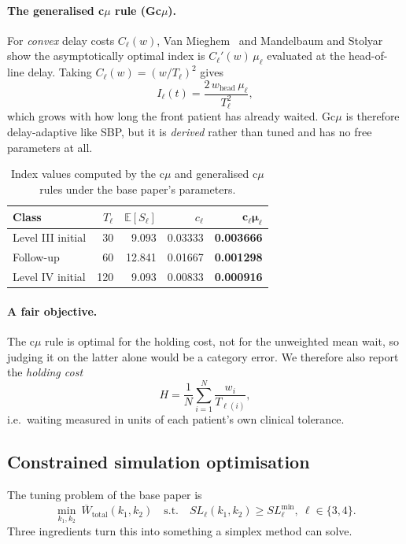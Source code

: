 \documentclass[sigconf,nonacm]{acmart}
\newcommand{\best}[1]{\textbf{#1}}
\begin{document}
\paragraph{The generalised c$\mu$ rule (Gc$\mu$).}
For \emph{convex} delay costs $C_\ell(w)$, Van Mieghem~\cite{vanmieghem1995gcmu}
and Mandelbaum and Stolyar~\cite{mandelbaum2004convex} show the asymptotically
optimal index is $C_\ell'(w)\,\mu_\ell$ evaluated at the head-of-line delay.
Taking $C_\ell(w)=(w/T_\ell)^2$ gives
\begin{equation}
I_\ell(t) = \frac{2\,w_{\text{head}}\,\mu_\ell}{T_\ell^{2}} ,
\label{eq:gcmu}
\end{equation}
which grows with how long the front patient has already waited. Gc$\mu$ is
therefore delay-adaptive like SBP, but it is \emph{derived} rather than tuned
and has no free parameters at all.

\begin{table}[t]
\caption{Index values computed by the c$\mu$ and generalised c$\mu$ rules under
         the base paper's parameters.}
\label{tab:cmu}
\small
\begin{tabular}{@{}lrrrr@{}}
\toprule
\textbf{Class} & $T_\ell$ & $\mathbb{E}[S_\ell]$ & $c_\ell$ & $\mathbf{c_\ell\mu_\ell}$ \\
\midrule
Level III initial & 30  & 9.093  & 0.03333 & \best{0.003666} \\
Follow-up         & 60  & 12.841 & 0.01667 & \best{0.001298} \\
Level IV initial  & 120 & 9.093  & 0.00833 & \best{0.000916} \\
\bottomrule
\end{tabular}
\end{table}

\paragraph{A fair objective.}
The c$\mu$ rule is optimal for the holding cost, not for the unweighted mean
wait, so judging it on the latter alone would be a category error. We therefore
also report the \emph{holding cost}
\begin{equation}
H = \frac{1}{N}\sum_{i=1}^{N} \frac{w_i}{T_{\ell(i)}} ,
\label{eq:holding}
\end{equation}
i.e.\ waiting measured in units of each patient's own clinical tolerance.

\subsection{Constrained simulation optimisation}
\label{sec:opt}
The tuning problem of the base paper is
\begin{equation}
\min_{k_1,k_2}\ \overline{W}_{\text{total}}(k_1,k_2)
\quad \text{s.t.} \quad SL_\ell(k_1,k_2) \ge SL^{\min}_\ell,\ \ell\in\{3,4\}.
\label{eq:problem}
\end{equation}
Three ingredients turn this into something a simplex method can solve.
\end{document}

